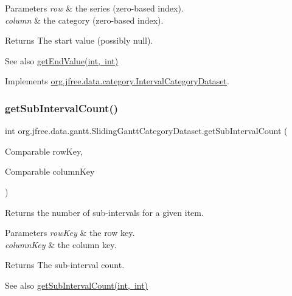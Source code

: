 \begin{DoxyParams}{Parameters}
{\em row} & the series (zero-\/based index). \\
\hline
{\em column} & the category (zero-\/based index).\\
\hline
\end{DoxyParams}
\begin{DoxyReturn}{Returns}
The start value (possibly {\ttfamily null}).
\end{DoxyReturn}
\begin{DoxySeeAlso}{See also}
\mbox{\hyperlink{classorg_1_1jfree_1_1data_1_1gantt_1_1_sliding_gantt_category_dataset_a5a3c5ebada67a763d8585d3b7950ebe4}{get\+End\+Value(int, int)}} 
\end{DoxySeeAlso}


Implements \mbox{\hyperlink{interfaceorg_1_1jfree_1_1data_1_1category_1_1_interval_category_dataset_ab39752773cf77a5ccbbae7851fd16aa6}{org.\+jfree.\+data.\+category.\+Interval\+Category\+Dataset}}.

\mbox{\label{classorg_1_1jfree_1_1data_1_1gantt_1_1_sliding_gantt_category_dataset_a4b8246a1601e700946bace11c5b0dc33}} 
\subsubsection{\texorpdfstring{get\+Sub\+Interval\+Count()}{getSubIntervalCount()}\hspace{0.1cm}{\footnotesize\ttfamily [1/2]}}
{\footnotesize\ttfamily int org.\+jfree.\+data.\+gantt.\+Sliding\+Gantt\+Category\+Dataset.\+get\+Sub\+Interval\+Count (\begin{DoxyParamCaption}\item[{Comparable}]{row\+Key,  }\item[{Comparable}]{column\+Key }\end{DoxyParamCaption})}

Returns the number of sub-\/intervals for a given item.


\begin{DoxyParams}{Parameters}
{\em row\+Key} & the row key. \\
\hline
{\em column\+Key} & the column key.\\
\hline
\end{DoxyParams}
\begin{DoxyReturn}{Returns}
The sub-\/interval count.
\end{DoxyReturn}
\begin{DoxySeeAlso}{See also}
\mbox{\hyperlink{classorg_1_1jfree_1_1data_1_1gantt_1_1_sliding_gantt_category_dataset_a2d8acd9a0033c1e36ae217dc067931b7}{get\+Sub\+Interval\+Count(int, int)}} 
\end{DoxySeeAlso}


